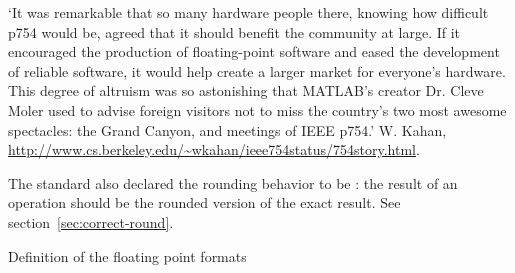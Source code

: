 \begin{remark}
  `It was remarkable that so many hardware
  people there, knowing how difficult p754 would be, agreed that it
  should benefit the community at large. If it encouraged the
  production of floating-point software and eased the development of
  reliable software, it would help create a larger market for
  everyone's hardware. This degree of altruism was so astonishing that
  MATLAB's creator Dr. Cleve Moler used to advise foreign visitors not
  to miss the country's two most awesome spectacles: the Grand Canyon,
  and meetings of IEEE p754.' W. Kahan,
  \url{http://www.cs.berkeley.edu/~wkahan/ieee754status/754story.html}.
\end{remark}


The standard also declared the rounding behavior
to be : the result of an operation should be the
rounded version of the exact result.
See section~\ref{sec:correct-round}.

 {Definition of the floating point formats}
\label{sec:ieee754def}

